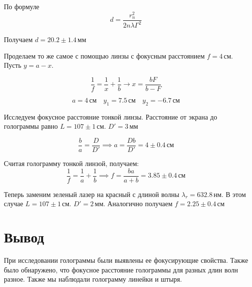 \documentclass[a4paper,12pt]{article}
\begin{document}
		По формуле 
		\begin{equation}
			d = \frac{r_n^2}{2n\lambda \Gamma^2}
		\end{equation}
		
		Получаем $d = 20.2 \pm 1.4\,\text{мм}$
		
		Проделаем то же самое с помощью линзы с фокусным расстоянием $f = 4\,\text{см}$. Пусть $y = a - x$.
		
		\begin{equation}
		\frac{1}{f}=\frac{1}{x}+\frac{1}{b}\rightarrow x=\frac{bF}{b-F}
		\end{equation}
		
		$$
		a = 4\,\text{см} \quad y_1 = 7.5\,\text{см}\quad y_2 = -6.7\,\text{см}
		$$
		
		Исследуем фокусное расстояние тонкой линзы. Расстояние от экрана до голограммы равно $L = 107\pm 1\,\text{см}$. $D' = 3\,\text{мм}$
		
		$$
		\frac{b}{a} = \frac{D}{D'} \implies a=\frac{Db}{D'} = 4\pm 0.4 \,\text{см}		
		$$
		
		Считая голограмму тонкой линзой, получаем:
		\begin{equation}
		\frac{1}{f}=\frac{1}{a}+\frac{1}{b}\implies f=\frac{ba}{a+b}=3.85\pm 0.4 \, \mbox{см}
		\end{equation}
		
		Теперь заменим зеленый лазер на красный с длиной волны $\lambda_r = 632.8\,\text{нм}$. В этом случае  $L = 107\pm 1\,\text{см}$. $D' = 2\,\text{мм}$. Аналогично получаем $f = 2.25 \pm 0.4\,  \mbox{см}$

		
		
		
	\section{Вывод}
		При исследовании голограммы были выявлены ее фокусирующие свойства. Также было обнаружено, что фокусное расстояние голограммы для разных длин волн разное. Также мы наблюдали голограмму линейки и штыря.
	
\end{document}
